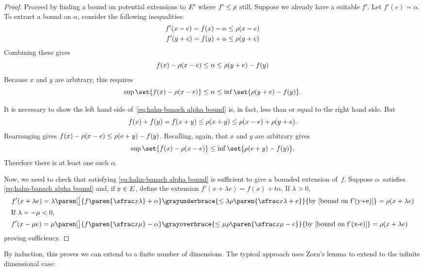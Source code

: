 \documentclass{scrartcl}
\begin{document}
\begin{proof}
  Proceed by finding a bound on potential extensions to \(E'\) where \(f'\leq \rho\) still. Suppose we already have a suitable \(f'\). Let \(f'(e)=\alpha\). To extract a bound on \(\alpha\), consider the following inequalities:
  \begin{align}
    f'(x-e) = f(x)-\alpha &\leq \rho(x-e) \label{bound on f'(x-e)} \\
    f'(y+e) = f(y) + \alpha &\leq \rho(y+e) \label{bound on f'(y+e)}
  \end{align}
    Combining these gives
    \[
      f(x)-\rho(x-e) \leq \alpha \leq \rho(y+e)-f(y)
    \]
    Because \(x\) and \(y\) are arbitrary, this requires
    \begin{equation}
      \sup\set{f(x)-\sublin(x-e)} \leq \alpha \leq \inf\set{\sublin(y+e)-f(y)}.\label{eq:hahn-banach alpha bound}
    \end{equation}

    It is necessary to show the left hand side of~\cref{eq:hahn-banach alpha bound} is, in fact, less than or equal to the right hand side. But
    \[
      f(x)+f(y) = f(x+y) \leq \rho(x+y)  \leq \rho(x-e)+\rho(y+e).
    \]
    Rearranging gives \(f(x)-\rho(x-e)\leq \rho(e+y)-f(y)\).  Recalling, again, that \(x\) and \(y\) are arbitrary gives
    \[
      \sup\set{f(x)-\sublin(x-e)}\leq \inf\set{\sublin(e+y)-f(y)}.
    \]
    Therefore there is at least one such \(\alpha\).

    Now, we need to check that satisfying \cref{eq:hahn-banach alpha bound} is sufficient to give a bounded extension of~\(f\). Suppose \(\alpha\)~satisfies \cref{eq:hahn-banach alpha bound} and, if \(x\in E\), define the extension \(f'(x+\lambda e) = f(x)+t\alpha\). If \(\lambda > 0\),
    \begin{align*}
      f'(x+\lambda e) = \lambda\paren[\big]{f\paren{\sfrac x\lambda}+\alpha}&
      \grayunderbrace{\leq\lambda{\sublin\paren{\sfrac x \lambda+e}}}{\text{by \cref{bound on f'(y+e)}}} = \sublin(x+\lambda e) \\
      \shortintertext{If \(\lambda = -\mu < 0\),}
      f'(x-\mu e) = \mu\paren[\big]{f\paren{\sfrac x\mu}-\alpha}&
      \grayoverbrace{\leq\mu{\sublin\paren{\sfrac x \mu-e}}}{\text{by \cref{bound on f'(x-e)}}} = \sublin(x+\lambda e)
    \end{align*}
    proving sufficiency.
\end{proof}
By induction, this proves we can extend to a finite number of dimensions. The typical approach uses Zorn's lemma to extend to the infinite dimensional case:
\end{document}
